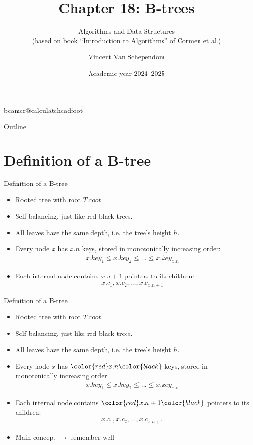 \documentclass[11pt,t]{beamer}
\title[A\&D Chapter 18: B-trees]{Chapter 18: B-trees} %
\subtitle{Algorithms and Data Structures\\(based on book “Introduction to Algorithms” of Cormen et al.)}
\author{Vincent Van Schependom}
\institute{KU Leuven Campus Kulak Kortrijk}
\date{Academic year 2024--2025}
\newcommand{\rood}[1]{\color{red}#1\color{black}}
\begin{document}
	\csname beamer@calculateheadfoot\endcsname %


	\begin{frame}
		\titlepage
	\end{frame}


	\begin{frame}{Outline}
		\hfill	{\large \parbox{.961\textwidth}{\tableofcontents[hideothersubsections]}}
	\end{frame}

	\section{Definition of a B-tree}

	\begin{frame}{Definition of a B-tree}
		\begin{itemize}[<+->]
			\item Rooted tree with root \(T.root\)
			\item Self-balancing, just like red-black trees.
			\item All leaves have the same depth, i.e. the tree's height \(h\).
			\item Every node \(x\) has \underline{\(x.n\) keys}, stored in monotonically increasing order: \begin{align*}
				{x.key_1 \leq x.key_2 \leq \ldots \leq x.key_{x.n}}
			\end{align*}
			\item Each internal node contains \underline{\(x.n+1\) pointers to its children}:
			\begin{align*}
				x.c_1, x.c_2, \ldots, x.c_{x.n+1}
			\end{align*}
		\end{itemize}
	\end{frame}

	\begin{frame}{Definition of a B-tree}
		\begin{itemize}
			\item Rooted tree with root \(T.root\)
			\item Self-balancing, just like red-black trees.
			\item All leaves have the same depth, i.e. the tree's height \(h\).
			\item Every node \(x\) has \(\rood{x.n}\) \rood{keys}, stored in monotonically increasing order: \begin{align*}
				{x.key_1 \leq x.key_2 \leq \ldots \leq x.key_{x.n}}
			\end{align*}
			\item Each internal node contains \(\rood{x.n+1}\) pointers to its \rood{children}:
			\begin{align*}
				x.c_1, x.c_2, \ldots, x.c_{x.n+1}
			\end{align*}
			\item Main concept \(\rightarrow\) remember well
		\end{itemize}
	\end{frame}
\end{document}
